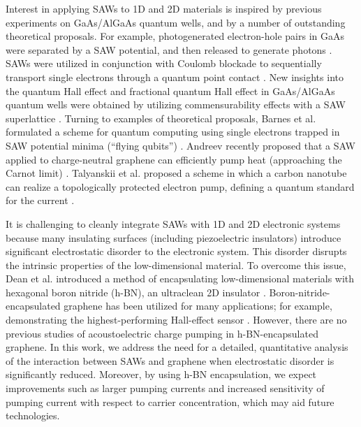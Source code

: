 \documentclass{beavtex_dub_edit}
\begin{document}
Interest in applying SAWs to 1D and 2D materials is inspired by previous experiments on GaAs/AlGaAs quantum wells, and by a number of outstanding theoretical proposals. For example, photogenerated electron-hole pairs in GaAs were separated by a SAW potential, and then released to generate photons \cite{rocke_acoustically_1997}. SAWs were utilized in conjunction with Coulomb blockade to sequentially transport single electrons through a quantum point contact \cite{talyanskii_single-electron_1997}. New insights into the quantum Hall effect and fractional quantum Hall effect in GaAs/AlGaAs quantum wells were obtained by utilizing commensurability effects with a SAW superlattice \cite{willett_experimental_1993,kukushkin_collective_2011}. Turning to examples of theoretical proposals, Barnes et al. formulated a scheme for quantum computing using single electrons trapped in SAW potential minima (“flying qubits”) \cite{barnes_quantum_2000,gumbs_quantum_2004,giavaras_quantum_2006}. Andreev recently proposed that a SAW applied to charge-neutral graphene can efficiently pump heat (approaching the Carnot limit) \cite{andreev_electronic_2022}. Talyanskii et al. proposed a scheme in which a carbon nanotube can realize a topologically protected electron pump, defining a quantum standard for the current \cite{talyanskii_quantized_2001}.

It is challenging to cleanly integrate SAWs with 1D and 2D electronic systems because many insulating surfaces (including piezoelectric insulators) introduce significant electrostatic disorder to the electronic system. This disorder disrupts the intrinsic properties of the low-dimensional material. To overcome this issue, Dean et al. introduced a method of encapsulating low-dimensional materials with hexagonal boron nitride (h-BN), an ultraclean 2D insulator \cite{dean_boron_2010}. Boron-nitride-encapsulated graphene has been utilized for many applications; for example, demonstrating the highest-performing Hall-effect sensor \cite{schaefer_magnetic_2020}. However, there are no previous studies of acoustoelectric charge pumping in h-BN-encapsulated graphene. In this work, we address the need for a detailed, quantitative analysis of the interaction between SAWs and graphene when electrostatic disorder is significantly reduced. Moreover, by using h-BN encapsulation, we expect improvements such as larger pumping currents and increased sensitivity of pumping current with respect to carrier concentration, which may aid future technologies. 
\end{document}
